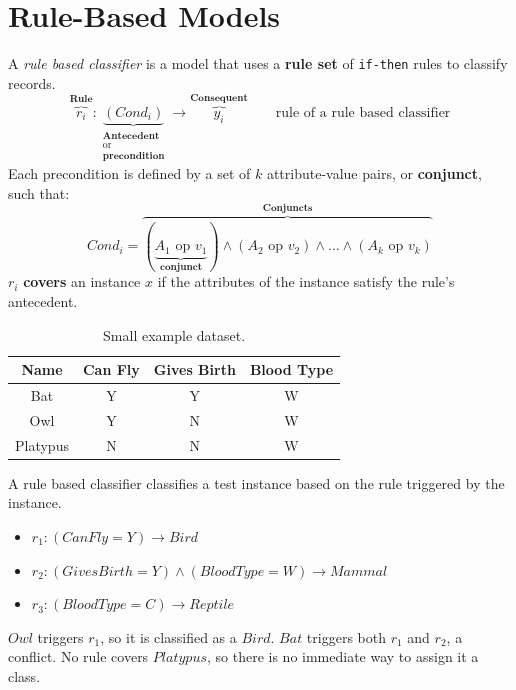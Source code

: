 \section{Rule-Based Models}
\begin{definition}
A \textit{rule based classifier} is a model that uses a \textbf{rule set} of \texttt{if-then} rules to classify records.
\begin{equation}\label{ruleStructureClassifier}
    \overbrace{r_i}^{\textbf{Rule}} : \underbrace{(Cond_i)}_{\substack{\textbf{Antecedent}\\\text{or} \\\textbf{precondition}}} \to \overbrace{y_i}^{\textbf{Consequent}}\qquad \text{rule of a rule based classifier}
\end{equation}        
Each precondition is defined by a set of $k$ attribute-value pairs, or \textbf{conjunct}, such that:
    \begin{equation}
    Cond_i = \overbrace{(\underbrace{A_1 \text{ op } v_1}_{\textbf{conjunct}}) \land (A_2 \text{ op } v_2) \land \dots \land (A_k \text{ op } v_k)}^{\textbf{Conjuncts}}
    \end{equation}
$r_i$ \textbf{covers} an instance $x$ if the attributes of the instance satisfy the rule's antecedent.
\end{definition}
\begin{table}[h]
    \centering
    \begin{tabular}{|c|c|c|c|}
    \hline
        Name & Can Fly & Gives Birth & Blood Type \\
    \hline
    \hline
        Bat & Y & Y & W \\
    \hline
        Owl & Y & N & W \\
    \hline
        Platypus & N & N & W \\
    \hline
    \end{tabular}
    \caption{Small example dataset.}
    \label{tab:small_dataset}
\end{table}
\begin{example}
A rule based classifier classifies a test instance based on the rule triggered by the instance.
\begin{itemize}
    \item     $r_1 : (Can Fly = Y) \xrightarrow{} Bird$
    \item    $r_2 : (Gives Birth = Y) \land (Blood Type = W) \xrightarrow{} Mammal$
    \item     $r_3 : (Blood Type = C) \xrightarrow{} Reptile$
\end{itemize}
$Owl$ triggers $r_1$, so it is classified as a $Bird$. $Bat$ triggers both $r_1$ and $r_2$, a conflict. No rule covers $Platypus$, so there is no immediate way to assign it a class.
\end{example}

